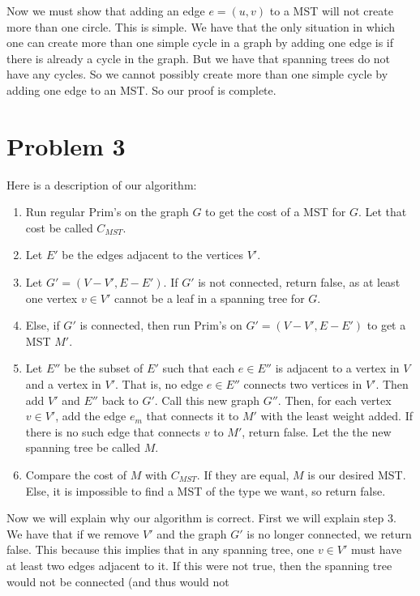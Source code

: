 \documentclass{article}
\begin{document}
Now we must show that adding an edge $e = (u,v)$ to a MST will not create
more than one circle. This is simple. We have that the only situation in which
one can create more than one simple cycle in a graph by adding one edge is if there
is already a cycle in the graph. But we have that spanning trees do not have
any cycles. So we cannot possibly create more than one simple cycle by
adding one edge to an MST. So our proof is complete.

\section*{Problem 3}
Here is a description of our algorithm:
\begin{enumerate}
    \item Run regular Prim's on the graph $G$ to get the cost of a MST
        for $G$. Let that cost be called $C_{MST}$.
    \item Let $E'$ be the edges adjacent to the vertices $V'$.
    \item Let $G' = (V-V', E-E')$. If $G'$ is not connected, return false,
        as at least one vertex $v \in V'$ cannot be a leaf in a
        spanning tree for $G$.
    \item Else, if $G'$ is connected, then run Prim's on $G' = (V-V', E-E')$
        to get a MST $M'$.
    \item Let $E''$ be the subset of $E'$ such that each $e \in E''$ is adjacent
        to a vertex in $V$ and a vertex in $V'$. That is, no edge $e \in E''$
        connects two vertices in $V'$. Then add $V'$ and $E''$ back to $G'$. Call
        this new graph $G''$. Then, for each vertex $v \in V'$, add the edge
        $e_m$ that connects it to $M'$ with the least weight added. If there
        is no such edge that connects $v$ to $M'$, return false. Let the
        the new spanning tree be called $M$.
    \item Compare the cost of $M$ with $C_{MST}$. If they are equal,
        $M$ is our desired MST. Else, it is impossible to find a MST of the type
        we want, so return false.
\end{enumerate}
Now we will explain why our algorithm is correct. First we will explain step
3. We have that if we remove $V'$ and the graph $G'$ is no longer connected,
we return false. This because this implies that in any spanning tree, one
$v \in V'$ must have at least two edges adjacent to it. If this were not
true, then the spanning tree would not be connected (and thus would not
\end{document}
